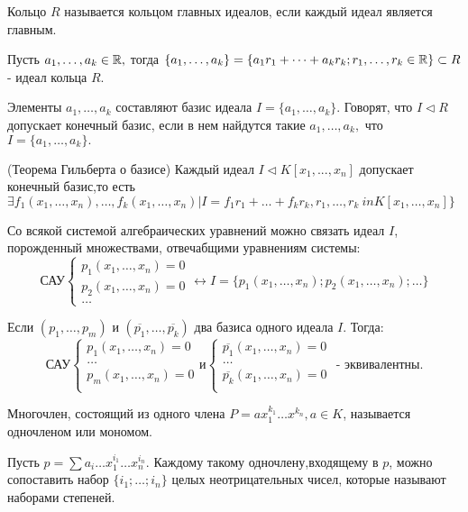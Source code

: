 \documentclass[12pt]{article}
\begin{document}
\opr Кольцо $R$ называется кольцом главных идеалов, если каждый идеал является главным.

\utv Пусть $a_1,\dots,a_k \in \mathbb{R},$ тогда $\{a_1,\dots,a_k\} = \{ a_1r_1+\dots+a_kr_k; r_1,\dots,r_k \in \mathbb{R}\} \subset R$ - идеал кольца $R$.

\opr Элементы $a_1,\dots,a_k$ составляют базис идеала $I = \{a_1,\dots,a_k\}.$ Говорят, что $I \triangleleft R$ допускает конечный базис, если в нем найдутся такие $a_1,\dots,a_k,$ что $I = \{a_1,\dots,a_k\}.$

\thri (Теорема Гильберта о базисе) Каждый идеал $I \triangleleft K [x_1,...,x_n]$ допускает конечный базис,то есть $\exists  f_1(x_1,\dots,x_n),\dots,f_k(x_1,\dots,x_n) | I = f_1r_1 + \dots + f_kr_k, r_1,\dots,r_k \ in K[x_1,\dots,x_n]\}$

Со всякой системой алгебраических уравнений можно связать идеал $I$, порожденный множествами, отвечабщими уравнениям системы:
\begin{equation*}
	\text{САУ}
	\begin{cases}
	   	p_1(x_1,\dots,x_n) = 0\\
	   	p_2(x_1,\dots,x_n) = 0\\
		\dots
	\end{cases}
\leftrightarrow I = \{p_1(x_1,\dots,x_n);p_2(x_1,\dots,x_n);\dots\}
\end{equation*}

\utv Если $(p_1,\dots,p_m)$ и $(\overline{p_1},\dots,\overline{p_k})$ два базиса одного идеала $I$. Тогда:
\begin{equation*}
	\text{САУ}
	\begin{cases}
	   	p_1(x_1,\dots,x_n) = 0\\
		\dots\\
	   	p_m(x_1,\dots,x_n) = 0\\
	\end{cases}
\text{и}
	\begin{cases}
	   	\overline{p_1}(x_1,\dots,x_n) = 0\\
		\dots\\
	   	\overline{p_k}(x_1,\dots,x_n) = 0\\
	\end{cases}
\text{ - эквивалентны.}
\end{equation*}

\opr Многочлен, состоящий из одного члена $P = ax_1^{k_1}\dots x^{k_n}, a \in K$, называется одночленом или мономом.

Пусть $p = \sum a_i\dots x_1^{i_1}\dots x_n^{i_n}.$ Каждому такому одночлену,входящему в $p$, можно сопоставить набор $\{i_1;\dots;i_n\}$  целых неотрицательных чисел, которые называют наборами степеней.
\end{document}
